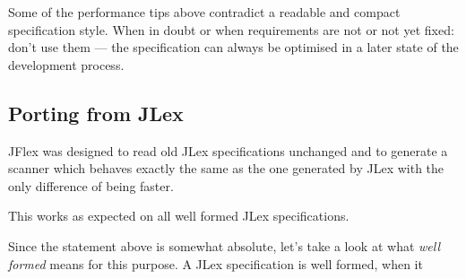 Some of the performance tips above contradict a readable and compact
specification style. When in doubt or when requirements are not or not
yet fixed: don't use them --- the specification can always be optimised
in a later state of the development process.


\subsection{Porting from JLex}\label{porting-from-jlex}

JFlex was designed to read old JLex specifications unchanged and to
generate a scanner which behaves exactly the same as the one generated
by JLex with the only difference of being faster.

This works as expected on all well formed JLex specifications.

Since the statement above is somewhat absolute, let's take a look at
what \emph{well formed} means for this purpose. A JLex specification is
well formed, when it

